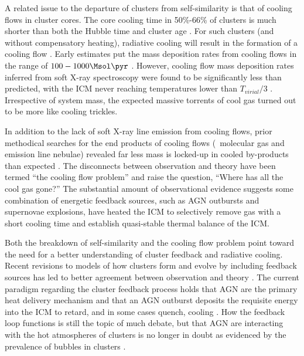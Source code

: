 \documentclass{emulateapj}
\begin{document}
A related issue to the departure of clusters from self-similarity is
that of cooling flows in cluster cores. The core cooling time in
50\%-66\% of clusters is much shorter than both the Hubble time and
cluster age \citep{1984ApJ...285....1S, 1992MNRAS.258..177E, white97,
  1998MNRAS.298..416P, 2005MNRAS.359.1481B}. For such clusters (and
without compensatory heating), radiative cooling will result in the
formation of a cooling flow \citep[see][for a
  review]{fabiancfreview}. Early estimates put the mass deposition
rates from cooling flows in the range of $100-1000 \Msol \pyr$
\citep[\eg][]{1984ApJ...276...38J, 1994MNRAS.270L...1E,
  1998MNRAS.298..416P}. However, cooling flow mass deposition rates
inferred from soft X-ray spectroscopy were found to be significantly
less than predicted, with the ICM never reaching temperatures lower
than $T_{virial}/3$ \citep{tamura01, peterson01, peterson03,
  2004A&A...413..415K}. Irrespective of system mass, the expected
massive torrents of cool gas turned out to be more like cooling
trickles.

In addition to the lack of soft X-ray line emission from cooling
flows, prior methodical searches for the end products of cooling flows
(\ie\ molecular gas and emission line nebulae) revealed far less mass
is locked-up in cooled by-products than expected \citep{heckman89,
mcnamara90, odea94, voit95}. The disconnects between observation and
theory have been termed ``the cooling flow problem'' and raise the
question, ``Where has all the cool gas gone?'' The substantial amount
of observational evidence suggests some combination of energetic
feedback sources, such as AGN outbursts and supernovae explosions,
have heated the ICM to selectively remove gas with a short cooling
time and establish quasi-stable thermal balance of the ICM.

Both the breakdown of self-similarity and the cooling flow problem
point toward the need for a better understanding of cluster feedback
and radiative cooling. Recent revisions to models of how clusters form
and evolve by including feedback sources has led to better agreement
between observation and theory \citep{bower06, croton06, saro06}. The
current paradigm regarding the cluster feedback process holds that AGN
are the primary heat delivery mechanism and that an AGN outburst
deposits the requisite energy into the ICM to retard, and in some
cases quench, cooling \citep[see][for a review]{mcnamrev}. How the
feedback loop functions is still the topic of much debate, but that
AGN are interacting with the hot atmospheres of clusters is no longer
in doubt as evidenced by the prevalence of bubbles in clusters
\citep[\eg][]{birzan04}.
\end{document}
